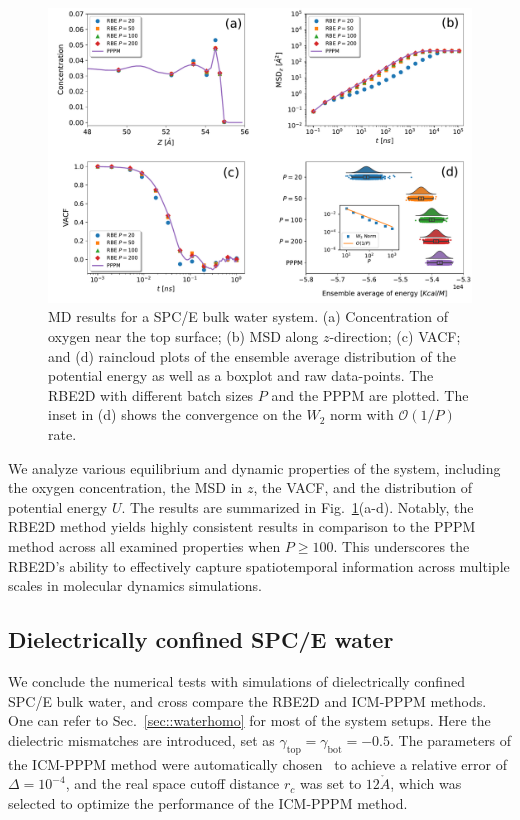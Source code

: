 \begin{figure}[ht!]
\centering
\includegraphics[width=1.0\linewidth]{figs/Density_new.pdf}
	\caption{MD results for a SPC/E bulk water system. (a)  Concentration of oxygen near the top surface; (b)  MSD along $z$-direction; (c)  VACF; and (d)  raincloud plots of the ensemble average distribution of the potential energy as well as a boxplot and raw data-points. The RBE2D with different batch sizes $P$ and the PPPM are plotted. The inset in (d) shows the convergence on the $W_2$ norm with $\mathcal{O}(1/P)$ rate.}
	\label{fig:Water}
\end{figure}

We analyze various equilibrium and dynamic properties of the system, including the oxygen concentration, the MSD in $z$, the VACF, and the distribution of potential energy $U$.
The results are summarized in Fig.~\ref{fig:Water}(a-d).
Notably, the RBE2D method yields highly consistent results in comparison to the PPPM method across all examined properties when $P \geq 100$. 
This underscores the RBE2D's ability to effectively capture spatiotemporal information across multiple scales in molecular dynamics simulations.

\subsection{Dielectrically confined SPC/E water}

We conclude the numerical tests with simulations of dielectrically confined SPC/E bulk water, and cross compare the RBE2D and ICM-PPPM methods. 
One can refer to Sec.~\ref{sec::waterhomo} for most of the system setups.
Here the dielectric mismatches are introduced, set as $\gamma_{\text{top}}=\gamma_{\text{bot}}=-0.5$. 
The parameters of the ICM-PPPM method were automatically chosen~\cite{kolafa1992cutoff} to achieve a relative error of $\Delta=10^{-4}$, and the real space cutoff distance $r_c$ was set to $12\mathring{A}$, which was selected to optimize the performance of the ICM-PPPM method. 

